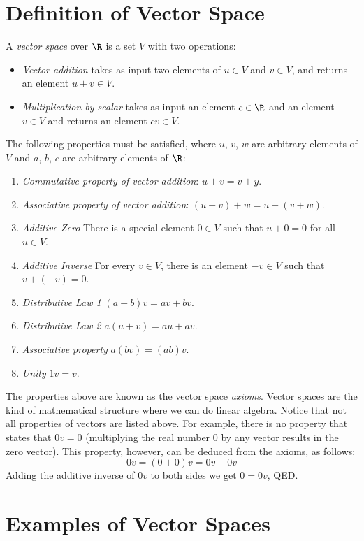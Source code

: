 \documentclass[12pt]{article}
\begin{document}
\section{Definition of Vector Space}

A \emph{vector space} over $\R$ is a set $V$ with two operations:
\begin{itemize}
\item \emph{Vector addition} takes as input two elements of $u\in V$ and $v\in V$, and returns an element $u+v\in V$.
\item \emph{Multiplication by scalar} takes as input an element $c\in\R$ and an element $v\in V$ and returns an element $cv\in V$.
\end{itemize}
The following properties must be satisfied, where $u$, $v$, $w$ are arbitrary elements of $V$ and $a$, $b$, $c$ are arbitrary elements of $\R$:
\begin{enumerate}
\item \emph{Commutative property of vector addition}: $u+v=v+y$.
\item \emph{Associative property of vector addition}: $(u+v)+w=u+(v+w)$.
\item \emph{Additive Zero} There is a special element $0\in V$ such that $u+0=0$ for all $u\in V$.
\item \emph{Additive Inverse} For every $v\in V$, there is an element $-v\in V$ such that $v+(-v)=0$. \item \emph{Distributive Law 1} $(a+b)v=av+bv$.
\item \emph{Distributive Law 2} $a(u+v)=au+av$.
\item \emph{Associative property} $a(bv)=(ab)v$.
\item \emph{Unity} $1v=v$. 
\end{enumerate}

The properties above are known as the vector space \emph{axioms}. Vector spaces are the kind of mathematical structure where we can do linear algebra. Notice that not all properties of vectors are listed above. For example, there is no property that states that $0v=0$ (multiplying the real number $0$ by any vector results in the zero vector). This property, however, can be deduced from the axioms, as follows:
\[
0v = (0+0)v=0v+0v
\]
Adding the additive inverse of $0v$ to both sides we get $0=0v$, QED.

\section{Examples of Vector Spaces}
\end{document}
